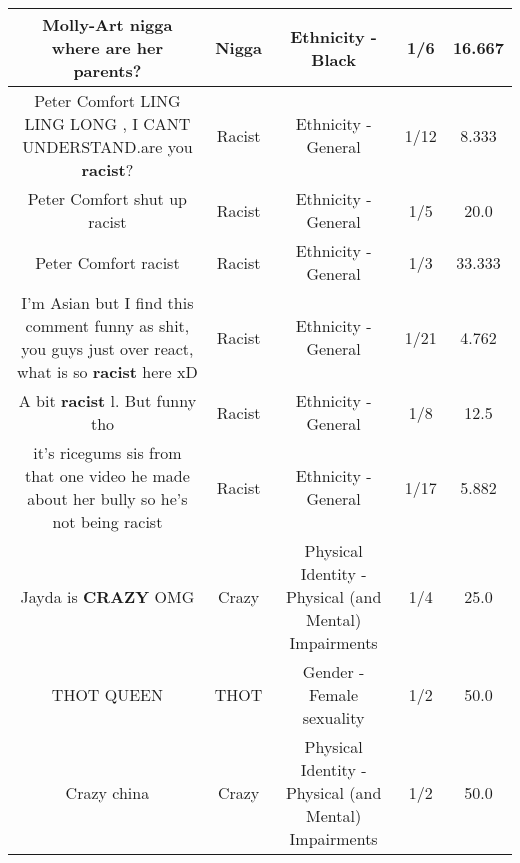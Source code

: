 \documentclass[11pt]{article}
\newlength\mylength
\begin{document}
\begin{center}
\begin{longtable}{|C{.65\mylength}|C{.30\mylength}|C{.12\mylength}|C{.12\mylength}|C{.12\mylength}|}
  \small Molly-Art \textbf{nigga} where are her parents?\normalsize   & Nigga & Ethnicity - Black & 1/6 & 16.667 \\  \hline
  \small Peter Comfort LING LING LONG , I CANT UNDERSTAND.are you \textbf{racist}?\normalsize   & Racist & Ethnicity - General & 1/12 & 8.333 \\  \hline
  \small Peter Comfort shut up racist\normalsize   & Racist & Ethnicity - General & 1/5 & 20.0 \\  \hline
  \small Peter Comfort racist\normalsize   & Racist & Ethnicity - General & 1/3 & 33.333 \\  \hline
  \small I'm Asian but I find this comment funny as shit, you guys just over react, what is so \textbf{racist} here xD\normalsize   & Racist & Ethnicity - General & 1/21 & 4.762 \\  \hline
  \small A bit \textbf{racist} l. But funny tho 😬\normalsize   & Racist & Ethnicity - General & 1/8 & 12.5 \\  \hline
  \small it's ricegums sis from that one video he made about her bully so he's not being racist\normalsize   & Racist & Ethnicity - General & 1/17 & 5.882 \\  \hline
  \small Jayda is \textbf{CRAZY} OMG\normalsize   & Crazy & Physical Identity - Physical (and Mental) Impairments & 1/4 & 25.0 \\  \hline
  \small THOT QUEEN\normalsize   & THOT & Gender - Female sexuality & 1/2 & 50.0 \\  \hline
  \small Crazy china\normalsize   & Crazy & Physical Identity - Physical (and Mental) Impairments & 1/2 & 50.0 \\  \hline

\end{longtable}
\end{center}
\end{document}
